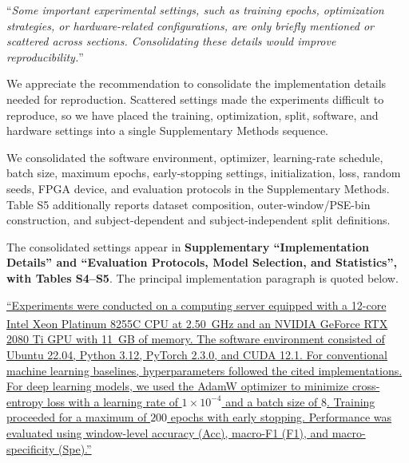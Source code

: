 \documentclass[12pt,technote,onecolumn]{IEEEtran}
\begin{document}
\EvidenceMainFigTwo

\vspace{4mm}

``{\it Some important experimental settings, such as training epochs,
optimization strategies, or hardware-related configurations, are only
briefly mentioned or scattered across sections. Consolidating these
details would improve reproducibility.}''
\vspace{1mm}


We appreciate the recommendation to consolidate the implementation details needed for reproduction. Scattered settings made the experiments difficult to reproduce, so we have placed the training, optimization, split, software, and hardware settings into a single Supplementary Methods sequence.

We consolidated the software environment, optimizer, learning-rate
schedule, batch size, maximum epochs, early-stopping settings,
initialization, loss, random seeds, FPGA device, and evaluation
protocols in the Supplementary Methods. Table S5 additionally reports
dataset composition, outer-window/PSE-bin construction, and
subject-dependent and subject-independent split definitions.



The consolidated settings appear in \textbf{Supplementary ``Implementation Details'' and ``Evaluation Protocols, Model Selection, and Statistics'', with Tables S4--S5}. The principal implementation paragraph is quoted below.

\uline{``Experiments were conducted on a computing server equipped with a 12-core Intel\textsuperscript{\textregistered} Xeon\textsuperscript{\textregistered} Platinum 8255C CPU at 2.50~GHz and an NVIDIA GeForce RTX 2080 Ti GPU with 11~GB of memory. The software environment consisted of Ubuntu 22.04, Python 3.12, PyTorch 2.3.0, and CUDA 12.1. For conventional machine learning baselines, hyperparameters followed the cited implementations. For deep learning models, we used the AdamW optimizer \cite{ref64} to minimize cross-entropy loss with a learning rate of $1\times10^{-4}$ and a batch size of $8$. Training proceeded for a maximum of $200$ epochs with early stopping. Performance was evaluated using window-level accuracy (Acc), macro-F1 (F1), and macro-specificity (Spe).''}
\end{document}
